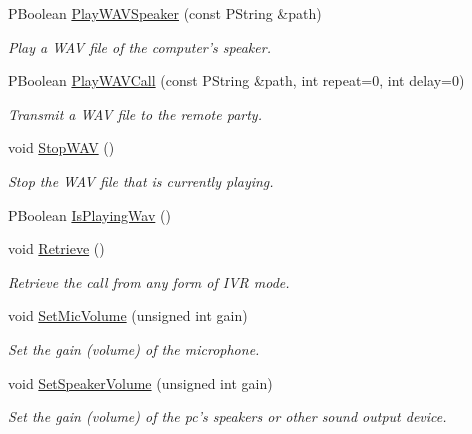 \begin{CompactItemize}
PBoolean \hyperlink{classTelephonyIfc_84e1d2f8049e2085d84856f9c03a687f}{PlayWAVSpeaker} (const PString \&path)
\begin{CompactList}\small\item\em Play a WAV file of the computer's speaker. \item\end{CompactList}\item 
PBoolean \hyperlink{classTelephonyIfc_15c768f4f006a0dbe7b16c8b44ccb9cb}{PlayWAVCall} (const PString \&path, int repeat=0, int delay=0)
\begin{CompactList}\small\item\em Transmit a WAV file to the remote party. \item\end{CompactList}\item 
void \hyperlink{classTelephonyIfc_6bf03dc65c5128fc1b7c299a6e40740f}{StopWAV} ()
\begin{CompactList}\small\item\em Stop the WAV file that is currently playing. \item\end{CompactList}\item 
PBoolean \hyperlink{classTelephonyIfc_a471fa455406339841ed30bddedb7dab}{IsPlayingWav} ()
\item 
void \hyperlink{classTelephonyIfc_e5318586774b3cae6afd9bd3596ac0a6}{Retrieve} ()
\begin{CompactList}\small\item\em Retrieve the call from any form of IVR mode. \item\end{CompactList}\item 
void \hyperlink{classTelephonyIfc_9c7068e7f0ef2d4498272b4a20361d4c}{SetMicVolume} (unsigned int gain)
\begin{CompactList}\small\item\em Set the gain (volume) of the microphone. \item\end{CompactList}\item 
void \hyperlink{classTelephonyIfc_8cf9b680409dfad0e8453a93b1057af2}{SetSpeakerVolume} (unsigned int gain)
\begin{CompactList}\small\item\em Set the gain (volume) of the pc's speakers or other sound output device. \item\end{CompactList}\item 

\end{CompactItemize}
